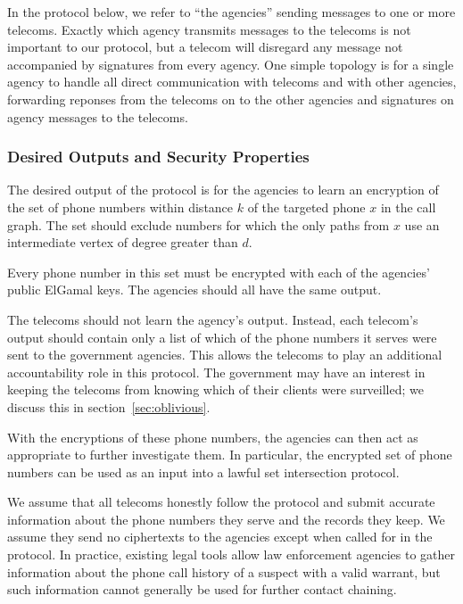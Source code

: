 In the protocol below, we refer to ``the agencies'' sending messages to one or more telecoms. Exactly which agency transmits messages to the telecoms is not important to our protocol, but a telecom will disregard any message not accompanied by signatures from every agency. One simple topology is for a single agency to handle all direct communication with telecoms and with other agencies, forwarding reponses from the telecoms on to the other agencies and signatures on agency messages to the telecoms.



\subsubsection{Desired Outputs and Security Properties}



The desired output of the protocol is for the agencies to learn an encryption of the set of phone numbers within distance $k$ of the targeted phone $x$ in the call graph. The set should exclude numbers for which the only paths from $x$ use an intermediate vertex of degree greater than $d$.



Every phone number in this set must be encrypted with each of the agencies' public ElGamal keys. The agencies should all have the same output.



The telecoms should not learn the agency's output. Instead, each telecom's output should contain only a list of which of the phone numbers it serves were sent to the government agencies. This allows the telecoms to play an additional accountability role in this protocol. The government may have an interest in keeping the telecoms from knowing which of their clients were surveilled; we discuss this in section~\ref{sec:oblivious}.



With the encryptions of these phone numbers, the agencies can then act as appropriate to further investigate them. In particular, the encrypted set of phone numbers can be used as an input into a lawful set intersection protocol.



We assume that all telecoms honestly follow the protocol and submit accurate information about the phone numbers they serve and the records they keep. We assume they send no ciphertexts to the agencies except when called for in the protocol. In practice, existing legal tools allow law enforcement agencies to gather information about the phone call history of a suspect with a valid warrant, but such information cannot generally be used for further contact chaining.



